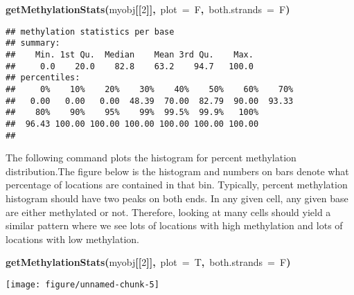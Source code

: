 \documentclass{article}
\makeatletter
\newcommand{\hlnumber}[1]{\textcolor[rgb]{0,0,0}{#1}}%
\newcommand{\hlfunctioncall}[1]{\textcolor[rgb]{.5,0,.33}{\textbf{#1}}}%
\newcommand{\hlkeyword}[1]{\textbf{#1}}%
\newcommand{\hlargument}[1]{\textcolor[rgb]{.69,.25,.02}{#1}}%
\newcommand{\hlsymbol}[1]{#1}%
\newenvironment{kframe}{%
 \def\FrameCommand##1{\hskip\@totalleftmargin \hskip-\fboxsep
 \colorbox{shadecolor}{##1}\hskip-\fboxsep
     \hskip-\linewidth \hskip-\@totalleftmargin \hskip\columnwidth}%
 \MakeFramed {\advance\hsize-\width
   \@totalleftmargin\z@ \linewidth\hsize
   \@setminipage}}%
 {\par\unskip\endMakeFramed}
\newenvironment{knitrout}{}{} %
\makeatother
\begin{document}
\begin{knitrout}
\color{fgcolor}\begin{kframe}
\begin{flushleft}
\ttfamily\noindent
\hlfunctioncall{getMethylationStats}\hlkeyword{(}\hlsymbol{myobj}\hlkeyword{[[}\hlnumber{2}\hlkeyword{]}\hlkeyword{]}\hlkeyword{,}{\ }\hlargument{plot}{\ }\hlargument{=}{\ }\hlsymbol{F}\hlkeyword{,}{\ }\hlargument{both.strands}{\ }\hlargument{=}{\ }\hlsymbol{F}\hlkeyword{)}\mbox{}
\normalfont
\end{flushleft}
\begin{verbatim}
## methylation statistics per base
## summary:
##    Min. 1st Qu.  Median    Mean 3rd Qu.    Max. 
##     0.0    20.0    82.8    63.2    94.7   100.0 
## percentiles:
##     0%    10%    20%    30%    40%    50%    60%    70% 
##   0.00   0.00   0.00  48.39  70.00  82.79  90.00  93.33 
##    80%    90%    95%    99%  99.5%  99.9%   100% 
##  96.43 100.00 100.00 100.00 100.00 100.00 100.00 
## 
\end{verbatim}
\end{kframe}
\end{knitrout}


The following command plots the histogram for percent methylation distribution.The figure below is the histogram and numbers on bars denote what percentage of locations are contained in that bin. Typically, percent methylation histogram should have two peaks on both ends. In any given cell, any given base are either methylated or not. Therefore, looking at many cells should yield a similar pattern where we see lots of locations with high methylation and lots of locations with low methylation.


\begin{center}
\begin{knitrout}
\color{fgcolor}\begin{kframe}
\begin{flushleft}
\ttfamily\noindent
\hlfunctioncall{getMethylationStats}\hlkeyword{(}\hlsymbol{myobj}\hlkeyword{[[}\hlnumber{2}\hlkeyword{]}\hlkeyword{]}\hlkeyword{,}{\ }\hlargument{plot}{\ }\hlargument{=}{\ }\hlsymbol{T}\hlkeyword{,}{\ }\hlargument{both.strands}{\ }\hlargument{=}{\ }\hlsymbol{F}\hlkeyword{)}\mbox{}
\normalfont
\end{flushleft}
\end{kframe}

{\centering \texttt{[image: figure/unnamed-chunk-5]} 

}


\end{knitrout}

\end{center}
\end{document}
